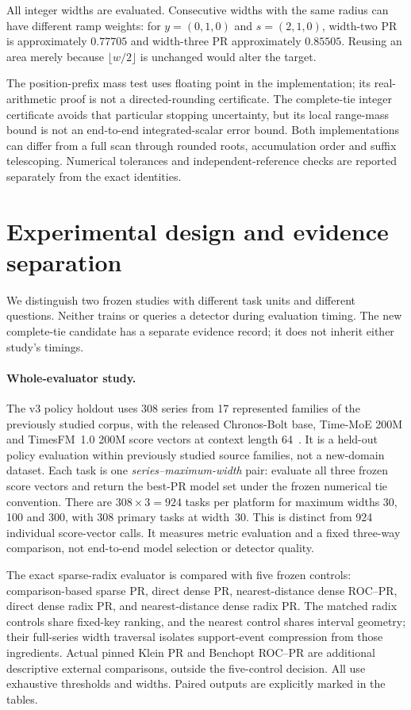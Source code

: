 All integer widths are evaluated. Consecutive widths with the same radius
can have different ramp weights: for $y=(0,1,0)$ and $s=(2,1,0)$, width-two
PR is approximately $0.77705$ and width-three PR approximately $0.85505$.
Reusing an area merely because $\lfloor w/2\rfloor$ is unchanged would alter
the target.

The position-prefix mass test uses floating point in the implementation;
its real-arithmetic proof is not a directed-rounding certificate. The
complete-tie integer certificate avoids that particular stopping uncertainty,
but its local range-mass bound is not an end-to-end integrated-scalar error
bound. Both implementations can differ from a full scan through rounded
roots, accumulation order and suffix telescoping. Numerical tolerances and
independent-reference checks are reported separately from the exact identities.

\section{Experimental design and evidence separation}
We distinguish two frozen studies with different task units and different
questions. Neither trains or queries a detector during evaluation timing.
The new complete-tie candidate has a separate evidence record; it does not
inherit either study's timings.

\paragraph{Whole-evaluator study.}
The v3 policy holdout uses 308 series from 17 represented families of the
previously studied corpus, with the released Chronos-Bolt base, Time-MoE
200M and TimesFM~1.0 200M score vectors at context length
64~\cite{zhu2026,tsbad}. It is a held-out policy evaluation within previously
studied source families, not a new-domain dataset. Each task is one
\emph{series--maximum-width} pair: evaluate all three frozen score vectors
and return the best-PR model set under the frozen numerical tie convention.
There are $308\times3=924$ tasks per platform for maximum widths 30, 100 and
300, with 308 primary tasks at width~30. This is distinct from 924 individual
score-vector calls. It measures metric evaluation and a fixed three-way
comparison, not end-to-end model selection or detector quality.

The exact sparse-radix evaluator is compared with five frozen controls:
comparison-based sparse PR, direct dense PR, nearest-distance dense ROC--PR,
direct dense radix PR, and nearest-distance dense radix PR. The matched
radix controls share fixed-key ranking, and the nearest control shares
interval geometry; their full-series width traversal isolates support-event
compression from those ingredients. Actual pinned Klein PR and Benchopt
ROC--PR are additional descriptive external comparisons, outside the
five-control decision. All use exhaustive thresholds and widths. Paired
outputs are explicitly marked in the tables.

